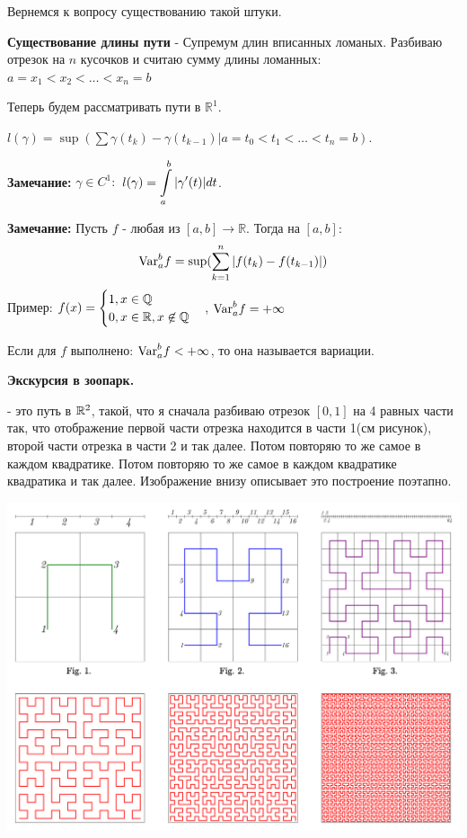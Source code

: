 Вернемся к вопросу существованию такой штуки.

\textbf{Существование длины пути} - Супремум длин вписанных ломаных. Разбиваю отрезок на $n$ кусочков и считаю сумму длины ломанных: $a=x_1<x_2<\ldots<x_n =b$

Теперь будем рассматривать пути в $\mathbb{R}^1$.

$l(\gamma) = \sup (\sum\limits\gamma(t_k)-\gamma(t_{k-1}) | a = t_0<t_1<\ldots<t_n=b)$.

\textbf{Замечание:} $\gamma \in C^1:$ $l(\gamma) = \displaystyle\int\limits_{a}^{b}|\gamma'(t)|dt$.

\textbf{Замечание:} Пусть $f$ - любая из $[a,b] \rightarrow \mathbb{R}$. Тогда  на $[a,b]$: $$\text{Var}_a^b f = \sup (\sum\limits_{k=1}^n |f(t_k)-f(t_{k-1})|)$$
Пример:
$f(x) = \begin{cases}
    1,x \in \mathbb{Q} \\
    0, x \in \mathbb{R}, x\not \in \mathbb{Q} 
\end{cases}$, $\text{Var}_{a}^b f = +\infty$

Если для $f$ выполнено: $\text{Var}_a^b f < + \infty$, то она называется  вариации.

\textbf{Экскурсия в зоопарк.}

 - это путь в $\mathbb{R}^2$, такой, что я сначала разбиваю отрезок $[0,1]$ на 4 равных части так, что отображение первой части отрезка находится в части 1(см рисунок), второй части отрезка в части 2 и так далее. Потом повторяю то же самое в каждом квадратике. Потом повторяю то же самое в каждом квадратике квадратика и так далее. Изображение внизу описывает это построение поэтапно.

\begin{center}
   \includegraphics[width = 15 cm]{assets/integral_hilbert_curve.svg.png}
\end{center}

